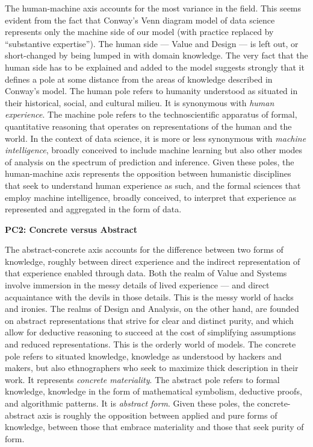 \documentclass[
  letterpaper,
  DIV=11,
  numbers=noendperiod]{scrreprt}
\begin{document}
The human-machine axis accounts for the most variance in the field. This
seems evident from the fact that Conway's Venn diagram model of data
science represents only the machine side of our model (with practice
replaced by ``substantive expertise''). The human side --- Value and
Design --- is left out, or short-changed by being lumped in with domain
knowledge. The very fact that the human side has to be explained and
added to the model suggests strongly that it defines a pole at some
distance from the areas of knowledge described in Conway's model. The
human pole refers to humanity understood as situated in their
historical, social, and cultural milieu. It is synonymous with
\emph{human experience}. The machine pole refers to the technoscientific
apparatus of formal, quantitative reasoning that operates on
representations of the human and the world. In the context of data
science, it is more or less synonymous with \emph{machine intelligence},
broadly conceived to include machine learning but also other modes of
analysis on the spectrum of prediction and inference. Given these poles,
the human-machine axis represents the opposition between humanistic
disciplines that seek to understand human experience as such, and the
formal sciences that employ machine intelligence, broadly conceived, to
interpret that experience as represented and aggregated in the form of
data.

\textbf{PC2: Concrete versus Abstract}

The abstract-concrete axis accounts for the difference between two forms
of knowledge, roughly between direct experience and the indirect
representation of that experience enabled through data. Both the realm
of Value and Systems involve immersion in the messy details of lived
experience --- and direct acquaintance with the devils in those details.
This is the messy world of hacks and ironies. The realms of Design and
Analysis, on the other hand, are founded on abstract representations
that strive for clear and distinct purity, and which allow for deductive
reasoning to succeed at the cost of simplifying assumptions and reduced
representations. This is the orderly world of models. The concrete pole
refers to situated knowledge, knowledge as understood by hackers and
makers, but also ethnographers who seek to maximize thick description in
their work. It represents \emph{concrete materiality}. The abstract pole
refers to formal knowledge, knowledge in the form of mathematical
symbolism, deductive proofs, and algorithmic patterns. It is
\emph{abstract form}. Given these poles, the concrete-abstract axis is
roughly the opposition between applied and pure forms of knowledge,
between those that embrace materiality and those that seek purity of
form.
\end{document}
